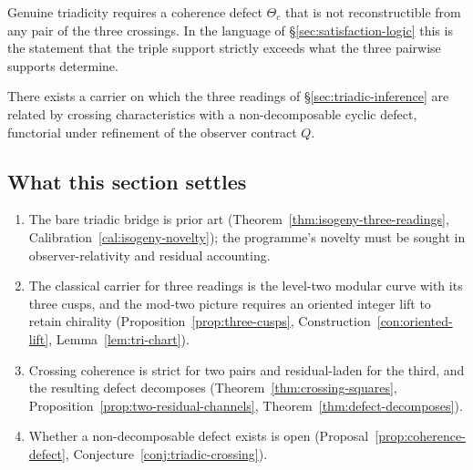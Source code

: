 \begin{proposal}\label{prop:coherence-defect}
Genuine triadicity requires a coherence defect $\Theta_c$ that is not reconstructible
from any pair of the three crossings.  In the language of
\S\ref{sec:satisfaction-logic} this is the statement that the triple support strictly
exceeds what the three pairwise supports determine.
\end{proposal}

\begin{conjecture}\label{conj:triadic-crossing}
There exists a carrier on which the three readings of \S\ref{sec:triadic-inference} are
related by crossing characteristics with a non-decomposable cyclic defect, functorial
under refinement of the observer contract $Q$.
\end{conjecture}

\subsection{What this section settles}

\begin{enumerate}
\item The bare triadic bridge is prior art
  (Theorem~\ref{thm:isogeny-three-readings}, Calibration~\ref{cal:isogeny-novelty}); the
  programme's novelty must be sought in observer-relativity and residual accounting.
\item The classical carrier for three readings is the level-two modular curve with its
  three cusps, and the mod-two picture requires an oriented integer lift to retain
  chirality (Proposition~\ref{prop:three-cusps},
  Construction~\ref{con:oriented-lift}, Lemma~\ref{lem:tri-chart}).
\item Crossing coherence is strict for two pairs and residual-laden for the third, and
  the resulting defect decomposes (Theorem~\ref{thm:crossing-squares},
  Proposition~\ref{prop:two-residual-channels}, Theorem~\ref{thm:defect-decomposes}).
\item Whether a non-decomposable defect exists is open
  (Proposal~\ref{prop:coherence-defect}, Conjecture~\ref{conj:triadic-crossing}).
\end{enumerate}
